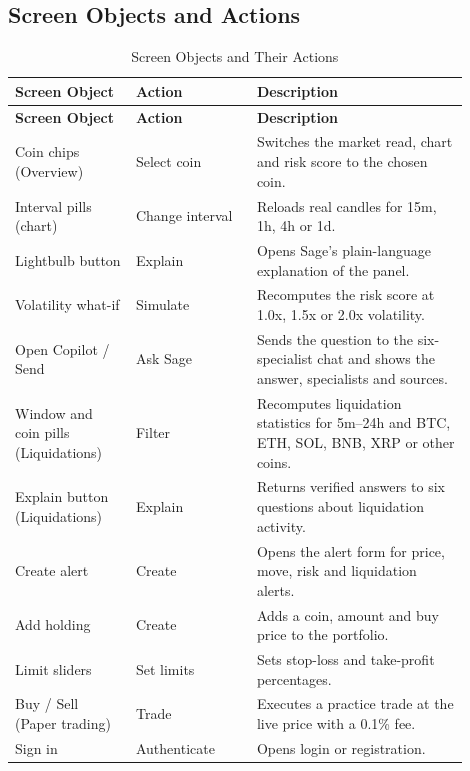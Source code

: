 \subsection{Screen Objects and Actions}
{\renewcommand{\arraystretch}{1.3}
\begin{longtable}{|p{0.24\linewidth}|p{0.24\linewidth}|p{0.42\linewidth}|}
\caption{Screen Objects and Their Actions}\label{tab:screenobjects}\\\hline
\textbf{Screen Object} & \textbf{Action} & \textbf{Description}\\\hline\endfirsthead
\hline\textbf{Screen Object} & \textbf{Action} & \textbf{Description}\\\hline\endhead
Coin chips (Overview) & Select coin & Switches the market read, chart and risk score to the chosen coin.\\\hline
Interval pills (chart) & Change interval & Reloads real candles for 15m, 1h, 4h or 1d.\\\hline
Lightbulb button & Explain & Opens Sage's plain-language explanation of the panel.\\\hline
Volatility what-if & Simulate & Recomputes the risk score at 1.0x, 1.5x or 2.0x volatility.\\\hline
Open Copilot / Send & Ask Sage & Sends the question to the six-specialist chat and shows the answer, specialists and sources.\\\hline
Window and coin pills (Liquidations) & Filter & Recomputes liquidation statistics for 5m--24h and BTC, ETH, SOL, BNB, XRP or other coins.\\\hline
Explain button (Liquidations) & Explain & Returns verified answers to six questions about liquidation activity.\\\hline
Create alert & Create & Opens the alert form for price, move, risk and liquidation alerts.\\\hline
Add holding & Create & Adds a coin, amount and buy price to the portfolio.\\\hline
Limit sliders & Set limits & Sets stop-loss and take-profit percentages.\\\hline
Buy / Sell (Paper trading) & Trade & Executes a practice trade at the live price with a 0.1\% fee.\\\hline
Sign in & Authenticate & Opens login or registration.\\\hline
\end{longtable}}

